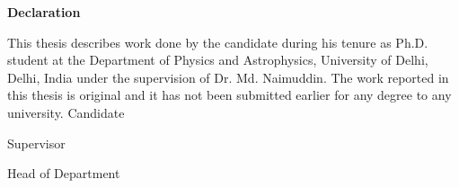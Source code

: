 \begin{center}
\textbf{\LARGE Declaration}
\end{center}
\vspace{1.5cm}
This thesis describes work done by the candidate during his tenure as Ph.D. student at the Department of Physics and Astrophysics, University of Delhi, Delhi, India under the supervision of Dr. Md. Naimuddin. The work reported in this thesis is original and it has not been submitted earlier for any degree to any university. 
\vfill
{\flushleft Candidate} \hspace{4cm} \dotfill \\
{}

\vfill
{\flushleft Supervisor} \hspace{4cm} \dotfill \\
{}

\vfill
{\flushleft Head of Department} \hspace{2.5cm} \dotfill \\
{}
\vfill